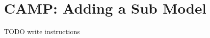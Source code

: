 \chapter{CAMP\+: Adding a Sub Model}
\hypertarget{camp_sub_model_add}{}\label{camp_sub_model_add}
TODO write instructions 